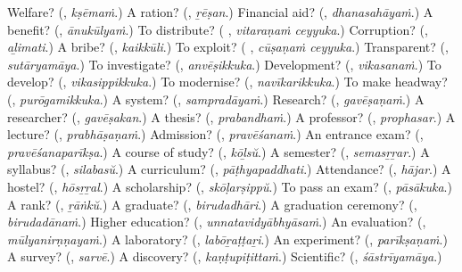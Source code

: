 \begin{tcolorbox}[breakable,colback=teal!4,colframe=teal!35!black,title={Before you move on}]
Welfare? (\textbf{}, \emph{kṣēmaṁ}.) A ration? (\textbf{}, \emph{ṟēṣan}.) Financial aid? (\textbf{}, \emph{dhanasahāyaṁ}.) A benefit? (\textbf{}, \emph{ānukūlyaṁ}.) To distribute? (\textbf{ }, \emph{vitaraṇaṁ ceyyuka}.) Corruption? (\textbf{}, \emph{aḻimati}.) A bribe? (\textbf{}, \emph{kaikkūli}.) To exploit? (\textbf{ }, \emph{cūṣaṇaṁ ceyyuka}.) Transparent? (\textbf{}, \emph{sutāryamāya}.) To investigate? (\textbf{}, \emph{anvēṣikkuka}.) Development? (\textbf{}, \emph{vikasanaṁ}.) To develop? (\textbf{}, \emph{vikasippikkuka}.) To modernise? (\textbf{}, \emph{navīkarikkuka}.) To make headway? (\textbf{}, \emph{purōgamikkuka}.) A system? (\textbf{}, \emph{sampradāyaṁ}.) Research? (\textbf{}, \emph{gavēṣaṇaṁ}.) A researcher? (\textbf{}, \emph{gavēṣakan}.) A thesis? (\textbf{}, \emph{prabandhaṁ}.) A professor? (\textbf{}, \emph{prophasar}.) A lecture? (\textbf{}, \emph{prabhāṣaṇaṁ}.) Admission? (\textbf{}, \emph{pravēśanaṁ}.) An entrance exam? (\textbf{}, \emph{pravēśanaparīkṣa}.) A course of study? (\textbf{}, \emph{kōḻsŭ}.) A semester? (\textbf{}, \emph{semasṟṟar}.) A syllabus? (\textbf{}, \emph{silabasŭ}.) A curriculum? (\textbf{}, \emph{pāṭhyapaddhati}.) Attendance? (\textbf{}, \emph{hājar}.) A hostel? (\textbf{}, \emph{hōsṟṟal}.) A scholarship? (\textbf{}, \emph{skōḷarṣippŭ}.) To pass an exam? (\textbf{}, \emph{pāsākuka}.) A rank? (\textbf{}, \emph{ṟāṅkŭ}.) A graduate? (\textbf{}, \emph{birudadhāri}.) A graduation ceremony? (\textbf{}, \emph{birudadānaṁ}.) Higher education? (\textbf{}, \emph{unnatavidyābhyāsaṁ}.) An evaluation? (\textbf{}, \emph{mūlyanirṇṇayaṁ}.) A laboratory? (\textbf{}, \emph{labōṟaṭṭaṟi}.) An experiment? (\textbf{}, \emph{parīkṣaṇaṁ}.) A survey? (\textbf{}, \emph{sarvē}.) A discovery? (\textbf{}, \emph{kaṇṭupiṭittaṁ}.) Scientific? (\textbf{}, \emph{śāstrīyamāya}.)
\end{tcolorbox}
